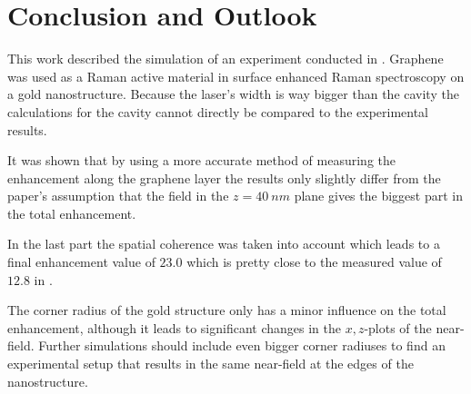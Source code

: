 \newpage
\section{Conclusion and Outlook}

This work described the simulation of an experiment conducted in \cite{heeg}. Graphene was used as a Raman active material in surface enhanced Raman spectroscopy on a gold nanostructure. Because the laser's width is way bigger than the cavity the calculations for the cavity cannot directly be compared to the experimental results.

It was shown that by using a more accurate method of measuring the enhancement along the graphene layer the results only slightly differ from the paper's assumption that the field in the $z=\SI{40}{nm}$ plane gives the biggest part in the total enhancement.

In the last part the spatial coherence was taken into account which leads to a final enhancement value of $23.0$ which is pretty close to the measured value of $12.8$ in \cite{heeg}.

The corner radius of the gold structure only has a minor influence on the total enhancement, although it leads to significant changes in the $x,z$-plots of the near-field. Further simulations should include even bigger corner radiuses to find an experimental setup that results in the same near-field at the edges of the nanostructure.

